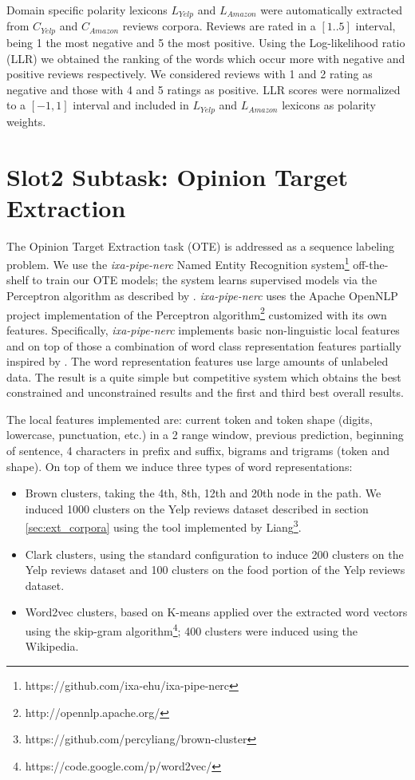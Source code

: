 \documentclass[11pt,letterpaper]{article}
\begin{document}
Domain specific polarity lexicons $L_{Yelp}$ and $L_{Amazon}$ were automatically extracted from $C_{Yelp}$ and $C_{Amazon}$ reviews corpora. Reviews are rated in a $[1..5]$ interval, being 1 the most negative and 5 the most positive. Using the Log-likelihood ratio (LLR) \cite{Dunning_1993} we obtained the ranking of the words which occur more with negative and positive reviews respectively. We considered reviews with 1 and 2 rating as negative and those with 4 and 5 ratings as positive. LLR scores were normalized to a $[-1,1]$ interval and included in $L_{Yelp}$ and $L_{Amazon}$ lexicons as polarity weights.

\section{Slot2 Subtask: Opinion Target Extraction}
\label{sec:slot2}

The Opinion Target Extraction task (OTE) is addressed as a sequence labeling problem. We use the \emph{ixa-pipe-nerc} Named Entity Recognition system\footnote{https://github.com/ixa-ehu/ixa-pipe-nerc} \cite{agerri2014ixapipes} off-the-shelf to train our OTE models; the system learns supervised models via the Perceptron algorithm as described by \cite{collins_discriminative_2002}. \emph{ixa-pipe-nerc} uses the Apache OpenNLP project implementation of the Perceptron algorithm\footnote{http://opennlp.apache.org/} customized with its own features. Specifically, \emph{ixa-pipe-nerc} implements
basic non-linguistic local features and on top of those a combination of
word class representation features partially inspired by \cite{turian-ratinov-bengio:2010:ACL}. The word representation features use large amounts of unlabeled data. The result is a quite simple but competitive system which obtains the best constrained and unconstrained results and the first and third best overall results.

The local features implemented are: current token and token shape (digits, lowercase, punctuation, etc.) in a 2 range window, previous prediction, beginning of sentence, 4 characters in prefix and suffix, bigrams and trigrams (token and shape). On top of them we induce three types of word representations:

\begin{itemize}
    \item Brown \cite{brown1992class} clusters, taking the 4th, 8th, 12th and
        20th node in the path. We induced 1000 clusters on the Yelp reviews dataset described
        in section \ref{sec:ext_corpora} using the tool implemented by Liang\footnote{https://github.com/percyliang/brown-cluster}.
    \item Clark \cite{clark2003combining} clusters, using the standard
        configuration to induce 200 clusters on the Yelp reviews dataset and 100 clusters on the food portion of the Yelp reviews dataset. 
    \item Word2vec \cite{mikolov2013distributed} clusters, based on K-means applied over the extracted word vectors using the skip-gram algorithm\footnote{https://code.google.com/p/word2vec/}; 400 clusters were induced using the Wikipedia.
\end{itemize}
\end{document}
